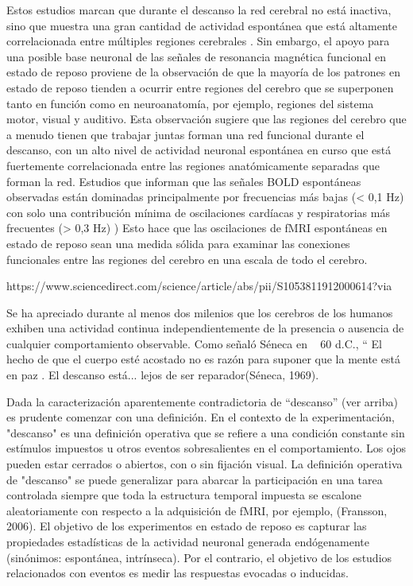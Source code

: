 Estos estudios marcan que durante el descanso la red cerebral no está inactiva, sino que muestra una gran cantidad de actividad espontánea que está altamente correlacionada entre múltiples regiones cerebrales . Sin embargo, el apoyo para una posible base neuronal de las señales de resonancia magnética funcional en estado de reposo proviene de la observación de que la mayoría de los patrones en estado de reposo tienden a ocurrir entre regiones del cerebro que se superponen tanto en función como en neuroanatomía, por ejemplo, regiones del sistema motor, visual y auditivo. Esta observación sugiere que las regiones del cerebro que a menudo tienen que trabajar juntas forman una red funcional durante el descanso, con un alto nivel de actividad neuronal espontánea en curso que está fuertemente correlacionada entre las regiones anatómicamente separadas que forman la red.    Estudios que informan que las señales BOLD espontáneas observadas están dominadas principalmente por frecuencias más bajas (< 0,1  Hz) con solo una contribución mínima de oscilaciones cardíacas y respiratorias más frecuentes (> 0,3  Hz) )
Esto hace que las oscilaciones de fMRI espontáneas en estado de reposo sean una medida sólida para examinar las conexiones funcionales entre las regiones del cerebro en una escala de todo el cerebro.


https://www.sciencedirect.com/science/article/abs/pii/S1053811912000614?via%


Se ha apreciado durante al menos dos milenios que los cerebros de los humanos exhiben una actividad continua independientemente de la presencia o ausencia de cualquier comportamiento observable. Como señaló Séneca en ~  60  d.C., “ El hecho de que el cuerpo esté acostado no es razón para suponer que la mente está en paz . El descanso está... lejos de ser reparador(Séneca, 1969).  

Dada la caracterización aparentemente contradictoria de “descanso” (ver arriba) es prudente comenzar con una definición. En el contexto de la experimentación, "descanso" es una definición operativa que se refiere a una condición constante sin estímulos impuestos u otros eventos sobresalientes en el comportamiento. Los ojos pueden estar cerrados o abiertos, con o sin fijación visual. La definición operativa de "descanso" se puede generalizar para abarcar la participación en una tarea controlada siempre que toda la estructura temporal impuesta se escalone aleatoriamente con respecto a la adquisición de fMRI, por ejemplo, (Fransson, 2006). El objetivo de los experimentos en estado de reposo es capturar las propiedades estadísticas de la actividad neuronal generada endógenamente (sinónimos: espontánea, intrínseca). Por el contrario, el objetivo de los estudios relacionados con eventos es medir las respuestas evocadas o inducidas.


